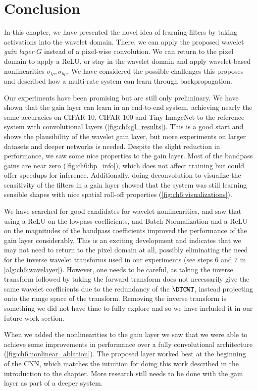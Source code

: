 \section{Conclusion}
In this chapter, we have presented the novel idea of learning filters by taking
activations into the wavelet domain. There, we can apply
the proposed wavelet \emph{gain layer} $G$ instead of a pixel-wise convolution. We can
return to the pixel domain to apply a ReLU, or stay in the wavelet domain
and apply wavelet-based nonlinearities $\sigma_{lp}, \sigma_{bp}$. We have
considered the possible challenges this proposes and described how a multi-rate
system can learn through backpropagation.

Our experiments have been promising but are still only preliminary. We have
shown that the gain layer can learn in an end-to-end system, achieving nearly
the same accuracies on CIFAR-10, CIFAR-100 and Tiny ImageNet to the reference system with
convolutional layers (\autoref{fig:ch6:gl_results}). This is a good start and shows the plausibility of
the wavelet gain layer, but more experiments on larger datasets and deeper
networks is needed. Despite the slight reduction in performance, we saw some
nice properties to the gain layer. Most of the bandpass gains are near zero
(\autoref{fig:ch6:bp_info}),
which does not affect training but could offer speedups for inference.
Additionally, doing deconvolution to visualize the sensitivity of the filters in
a gain layer showed that the system was still learning sensible shapes with nice
spatial roll-off properties (\autoref{fig:ch6:visualizations}).

We have searched for good candidates for wavelet nonlinearities, and saw that
using a ReLU on the lowpass coefficients, and
Batch Normalization and a ReLU on the magnitudes of the bandpass coefficients
improved the performance of the gain layer considerably. This is an exciting
development and indicates that we may not need to return to the pixel domain at
all, possibly eliminating the need for the inverse wavelet
transforms used in our experiments (see steps 6 and 7 in
\autoref{alg:ch6:wavelayer}). However, one needs to be careful, as taking the inverse transform
followed by taking the forward transform does not necessarily give the same
wavelet coefficients due to the redundancy of the $\DTCWT$, instead projecting
onto the range space of the transform. Removing the inverse transform is
something we did not have time to fully explore and so we have included it in
our future work section.

When we added the nonlinearities to the gain layer
we saw that we were able to achieve some
improvements in performance over a fully convolutional architecture
(\autoref{fig:ch6:nonlinear_ablation}). The proposed layer
worked best at the beginning of the CNN, which matches the intuition for doing
this work described in the introduction to the chapter. More research still
needs to be done with the gain layer as part of a deeper system.
